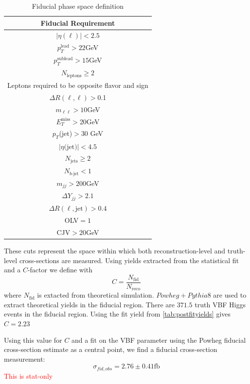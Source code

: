 \begin{table}[!ht]
\centering
\begin{tabular}{|c|}
\hline
Fiducial Requirement \\
\hline
$|\eta(\ell)|<2.5$ \\
$p_T^{\text{lead}}>22$GeV \\
$p_T^{\text{sublead}}>15$GeV \\
$N_{\text{leptons}}\geq2$ \\
Leptons required to be opposite flavor and sign \\
$\Delta R(\ell,\ell) >$0.1 \\
$m_{\ell\ell}>10$GeV \\
$E_T^{\text{miss}}>$20GeV \\
$p_T$(jet)$>$30 GeV \\
$|\eta\text{(jet)}|<4.5$ \\ 
$N_{\text{jets}} \geq 2$ \\
$N_{b\text{-jet}} < 1$ \\
$m_{jj} >200$GeV \\
$\Delta Y_{jj}>2.1$ \\
$\Delta R(\ell,\text{jet})>0.4$ \\
OLV$=1$ \\
CJV$>20$GeV \\
\hline
\end{tabular}
\caption{Fiducial phase space definition}
\label{tab:fiducial}
\end{table}
These cuts represent the space within which both reconstruction-level and truth-level cross-sections are measured. Using yields extracted from the statistical fit and a $C$-factor we define with 
\begin{equation}
C = \frac{N_\text{fid}}{N_{\text{reco}}}
\end{equation}
where $N_\text{fid}$ is extacted from theoretical simulation. $Powheg+Pythia8$ are used to extract theoretical yields in the fiducial region. There are $371.5$ truth VBF Higgs events in the fiducial region. Using the fit yield from \ref{tab:postfityields} gives $C=2.23$

Using this value for $C$ and a fit on the VBF parameter using the Powheg fiducial cross-section estimate as a central point, we find a fiducial cross-section measurement:
\begin{equation}
\sigma_{fid,obs} = 2.76 \pm 0.41 \text{fb} 
\end{equation}
\textcolor{red}{This is stat-only}


